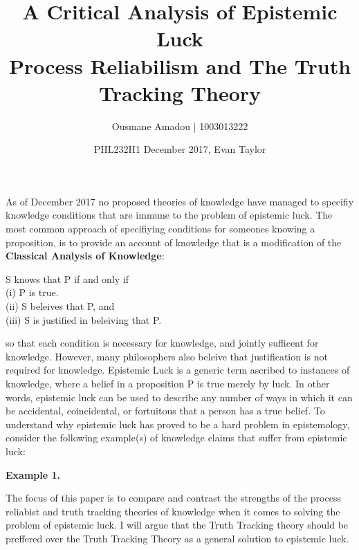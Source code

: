 \documentclass{article}
\title{%
  A Critical Analysis of Epistemic Luck \\
  \large Process Reliabilism and The Truth Tracking Theory }
\author{Ousmane Amadou | 1003013222}
\date{PHL232H1 December 2017, Evan Taylor}
\begin{document}
\maketitle

As of December 2017 no proposed theories of knowledge have managed
to specifiy knowledge conditions that are immune to the problem of
epistemic luck. %
The most common approach of specifiying conditions for someones knowing
a proposition, is to provide an account of knowledge that is a modification
of the \textbf{Classical Analysis of Knowledge}:
\begin{displayquote} %
   S knows that P if and only if \\
  (i) P is true. \\
  (ii) S beleives that P, and \\
  (iii) S is justified in beleiving that P.
\end{displayquote} so that each condition is necessary for knowledge, and jointly
sufficent for knowledge. However, many philosophers also beleive that justification
is not required for knowledge. Epistemic Luck is a generic term ascribed to instances of
knowledge, where a belief in a proposition P is true merely by luck. In other words,
epistemic luck can be used to describe any number of ways in which it can be
accidental, coincidental, or fortuitous that a person has a true belief. To understand
why epistemic luck has proved to be a hard problem in epistemology, consider
the following example(s) of knowledge claims that suffer from epistemic luck:

\begin{displayquote}
\textbf{Example 1.}
\end{displayquote}
The focus of this paper is to compare and contrast the strengths of the process
reliabist and truth tracking theories of knowledge when it comes to solving the
problem of epistemic luck. I will argue that the Truth Tracking theory should be
preffered over the Truth Tracking Theory as a general solution to epistemic luck.
\end{document}
